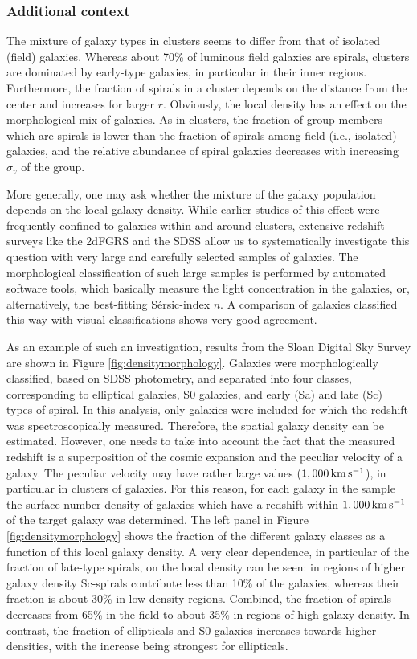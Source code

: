 \documentclass[a4paper,10pt]{article}
\begin{document}
\subsubsection{Additional context}

The mixture of galaxy types in clusters seems to differ from that of isolated (field) galaxies. Whereas about 70\% of luminous field galaxies are spirals, clusters are dominated by early-type galaxies, in particular in their inner regions. Furthermore, the fraction of spirals in a cluster depends on the distance from the center and increases for larger $r$. Obviously, the local density has an effect on the morphological mix of galaxies. As in clusters, the fraction of group members which are spirals is lower than the fraction of spirals among field (i.e., isolated) galaxies, and the relative abundance of spiral galaxies decreases with increasing $\sigma_v$ of the group.

{\noindent}More generally, one may ask whether the mixture of the galaxy population depends on the local galaxy density. While earlier studies of this effect were frequently confined to galaxies within and around clusters, extensive redshift surveys like the 2dFGRS and the SDSS allow us to systematically investigate this question with very large and carefully selected samples of galaxies. The morphological classification of such large samples is performed by automated software tools, which basically measure the light concentration in the galaxies, or, alternatively, the best-fitting S\'ersic-index $n$. A comparison of galaxies classified this way with visual classifications shows very good agreement.

{\noindent}As an example of such an investigation, results from the Sloan Digital Sky Survey are shown in Figure \ref{fig:densitymorphology}. Galaxies were morphologically classified, based on SDSS photometry, and separated into four classes, corresponding to elliptical galaxies, S0 galaxies, and early (Sa) and late (Sc) types of spiral. In this analysis, only galaxies were included for which the redshift was spectroscopically measured. Therefore, the spatial galaxy density can be estimated. However, one needs to take into account the fact that the measured redshift is a superposition of the cosmic expansion and the peculiar velocity of a galaxy. The peculiar velocity may have rather large values ($1,000\,{\rm km\,s^{-1}}$), in particular in clusters of galaxies. For this reason, for each galaxy in the sample the surface number density of galaxies which have a redshift within $1,000\,{\rm km\,s^{-1}}$ of the target galaxy was determined. The left panel in Figure \ref{fig:densitymorphology} shows the fraction of the different galaxy classes as a function of this local galaxy density. A very clear dependence, in particular of the fraction of late-type spirals, on the local density can be seen: in regions of higher galaxy density Sc-spirals contribute less than 10\% of the galaxies, whereas their fraction is about 30\% in low-density regions. Combined, the fraction of spirals decreases from 65\% in the field to about 35\% in regions of high galaxy density. In contrast, the fraction of ellipticals and S0 galaxies increases towards higher densities, with the increase being strongest for ellipticals.
\end{document}
